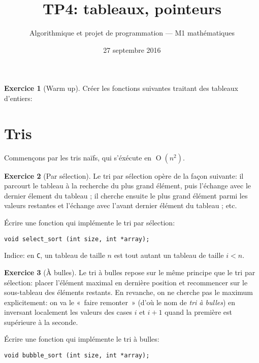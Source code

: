 \documentclass[french,a4paper]{article}
\title{\sffamily TP4: tableaux, pointeurs}%
\date{27 septembre 2016}%
\author{Algorithmique et projet de programmation --- M1
  mathématiques}%
\theoremstyle{definition}
\newtheorem{exercise}{Exercice}
\theoremstyle{remark}
\begin{document}
\maketitle

\begin{exercise}[Warm up]
  Créer les fonctions suivantes traitant des tableaux d'entiers:
  
\end{exercise}

\section{Tris}
\label{sec:sort}

Commençons par les tris naïfs, qui s'éxécute en
$\operatorname{O}(n^2)$.

\begin{exercise}[Par sélection]
  Le tri par sélection opère de la façon suivante: il parcourt le
  tableau à la recherche du plus grand élément, puis l'échange avec le
  dernier élement du tableau ; il cherche ensuite le plus grand
  élément parmi les valeurs restantes et l'échange avec l'avant
  dernier élément du tableau ; etc.

  \'Ecrire une fonction qui implémente le tri par sélection:
  \begin{lstlisting}
void select_sort (int size, int *array);
  \end{lstlisting}
  Indice: en {\tt C}, un tableau de taille $n$ est tout autant un
  tableau de taille $i<n$.
\end{exercise}

\begin{exercise}[\`A bulles]
  Le tri à bulles repose sur le même principe que le tri par
  sélection: placer l'élément maximal en dernière position et
  recommencer sur le sous-tableau des éléments restants. En revanche,
  on ne cherche pas le maximum explicitement: on va le «~faire
  remonter~» (d'où le nom de {\em tri à bulles}) en inversant
  localement les valeurs des cases $i$ et $i+1$ quand la première est
  supérieure à la seconde.

  \'Ecrire une fonction qui implémente le tri à bulles:
  \begin{lstlisting}
void bubble_sort (int size, int *array);    
  \end{lstlisting}
\end{exercise}
\end{document}
